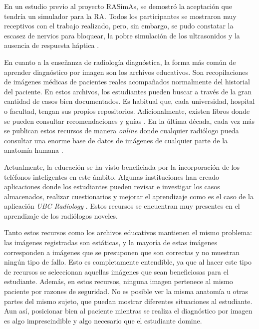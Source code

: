 En un estudio previo al proyecto \ac{RASimAs}, se demostró la aceptación que tendría un simulador para la \ac{RA}. Todos los participantes se mostraron muy receptivos con el trabajo realizado, pero, sin embargo, se pudo constatar la escasez de nervios para bloquear, la pobre simulación de los ultrasonidos y la ausencia de respuesta háptica \cite{Grottke2009594}.



En cuanto a la enseñanza de radiología diagnóstica, la forma más común de aprender diagnóstico por imagen son los archivos educativos. Son recopilaciones de imágenes médicas de pacientes reales acompañados normalmente del historial del paciente. En estos archivos, los estudiantes pueden buscar a través de la gran cantidad de casos bien documentados. Es habitual que, cada universidad, hospital o facultad, tengan sus propios repositorios. Adicionalmente, existen libros donde se pueden consultar recomendaciones y guías \cite{carver2012medical,manualpractico}.
En la última década, cada vez más se publican estos recursos de manera \emph{online} donde cualquier radiólogo pueda consultar una enorme base de datos de imágenes de cualquier parte de la anatomía humana \cite{deshpande2017integrated}. 

Actualmente, la educación se ha visto beneficiada por la incorporación de los teléfonos inteligentes en este ámbito. Algunas instituciones han creado aplicaciones donde los estudiantes pueden revisar e investigar los casos almacenados, realizar cuestionarios y mejorar el aprendizaje como es el caso de la aplicación \emph{UBC Radiology} \cite{Spouge2017}. Estos recursos se encuentran muy presentes en el aprendizaje de los radiólogos noveles.

Tanto estos recursos como los archivos educativos mantienen el mismo problema: las imágenes registradas son estáticas, y la mayoría de estas imágenes corresponden a imágenes que se presuponen que son correctas y no muestran ningún tipo de fallo. Esto es completamente entendible, ya que al hacer este tipo de recursos se seleccionan aquellas imágenes que sean beneficiosas para el estudiante. Además, en estos recursos, ninguna imagen pertenece al mismo paciente por razones de seguridad. No es posible ver la misma anatomía u otras partes del mismo sujeto, que puedan mostrar diferentes situaciones al estudiante. Aun así, posicionar bien al paciente mientras se realiza el diagnóstico por imagen es algo imprescindible y algo necesario que el estudiante domine. 

